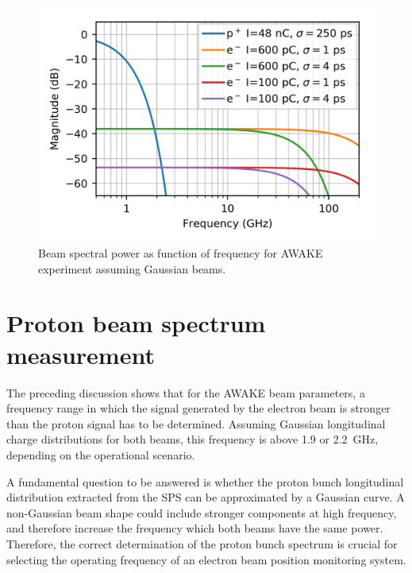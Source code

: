 \begin{figure}[!h]
\centering
\includegraphics[scale=1.1, keepaspectratio]{pictures/ideal}
\caption{Beam spectral power as function of frequency for AWAKE experiment assuming Gaussian beams.}
\label{spectrum_run2}
\end{figure}







\newpage




\section[Proton beam spectrum measurement]{Proton beam spectrum measurement}\label{sec:proton_shape}

The preceding discussion shows that for the AWAKE beam parameters, a frequency range in which the signal generated by the electron beam is stronger than the proton signal has to be determined. Assuming Gaussian longitudinal charge distributions for both beams, this frequency is above 1.9 or 2.2~GHz, depending on the operational scenario.

A fundamental question to be answered is whether the proton bunch longitudinal distribution extracted from the SPS can be approximated by a Gaussian curve. A non-Gaussian beam shape could include stronger components at high frequency, and therefore increase the frequency which both beams have the same power. Therefore, the correct determination of the proton bunch spectrum is crucial for selecting the operating frequency of an electron beam position monitoring system.

